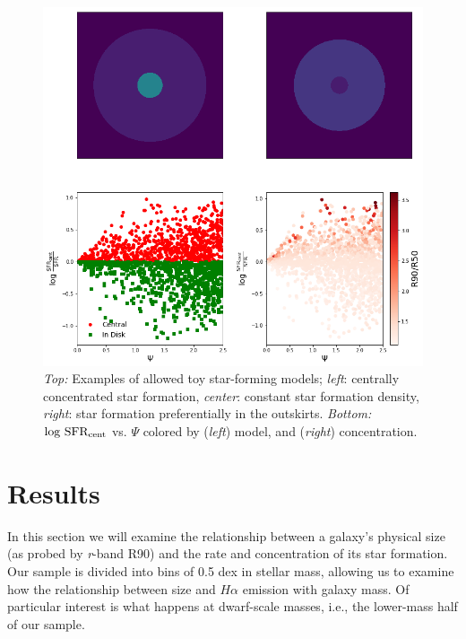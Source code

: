 \documentclass[iop]{emulateapj}
\begin{document}
\begin{figure}
	\centering
	\includegraphics[width=1.4 \columnwidth]{model.png}
	\caption{\textit{Top:} Examples of allowed toy star-forming models; \textit{left}: centrally concentrated star formation, \textit{center}: constant star formation density, \textit{right}: star formation preferentially in the outskirts. \textit{Bottom:} $\rm log \  SFR_{cent}$ vs. $\Psi$ colored by (\textit{left}) model, and (\textit{right}) concentration.}
	\label{fig:model}
	
\end{figure}


\section{Results}
\label{sec:results}

In this section we will examine the relationship between a galaxy's physical size (as probed by \textit{r}-band R90) and the rate and concentration of its star formation. Our sample is divided into bins of 0.5 dex in stellar mass, allowing us to examine how the relationship between size and $H\alpha$ emission with galaxy mass. Of particular interest is what happens at dwarf-scale masses, i.e., the lower-mass half of our sample.
\end{document}
